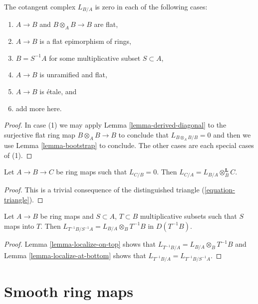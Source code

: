 \begin{lemma}
\label{lemma-when-zero}
The cotangent complex $L_{B/A}$ is zero in each of the following cases:
\begin{enumerate}
\item $A \to B$ and $B \otimes_A B \to B$ are flat,
\item $A \to B$ is a flat epimorphism of rings,
\item $B = S^{-1}A$ for some multiplicative subset $S \subset A$,
\item $A \to B$ is unramified and flat,
\item $A \to B$ is \'etale, and
\item add more here.
\end{enumerate}
\end{lemma}

\begin{proof}
In case (1) we may apply
Lemma \ref{lemma-derived-diagonal}
to the surjective flat ring map $B \otimes_A B \to B$
to conclude that $L_{B \otimes_A B/B} = 0$ and then we use
Lemma \ref{lemma-bootstrap}
to conclude. The other cases are each special cases of (1).
\end{proof}

\begin{lemma}
\label{lemma-localize-on-top}
Let $A \to B \to C$ be ring maps such that $L_{C/B} = 0$.
Then $L_{C/A} = L_{B/A} \otimes_B^\mathbf{L} C$.
\end{lemma}

\begin{proof}
This is a trivial consequence of 
the distinguished triangle (\ref{equation-triangle}).
\end{proof}

\begin{lemma}
\label{lemma-localize}
Let $A \to B$ be ring maps and $S \subset A$, $T \subset B$ multiplicative
subsets such that $S$ maps into $T$.
Then $L_{T^{-1}B/S^{-1}A} = L_{B/A} \otimes_B T^{-1}B$
in $D(T^{-1}B)$.
\end{lemma}

\begin{proof}
Lemma \ref{lemma-localize-on-top} shows that
$L_{T^{-1}B/A} = L_{B/A} \otimes_B T^{-1}B$
and Lemma \ref{lemma-localize-at-bottom}
shows that $L_{T^{-1}B/A} = L_{T^{-1}B/S^{-1}A}$.
\end{proof}





\section{Smooth ring maps}
\label{section-smooth}

